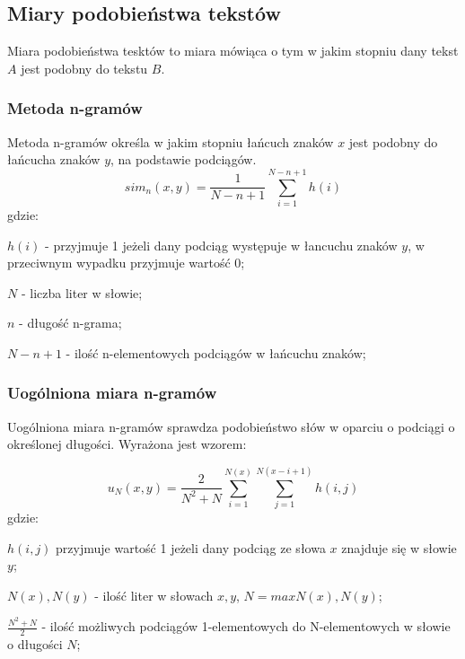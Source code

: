 \documentclass{classrep}
\begin{document}
\subsection{Miary podobieństwa tekstów}
Miara podobieństwa tesktów to miara mówiąca o tym w jakim stopniu dany tekst $A$ jest podobny do tekstu $B$.

\subsubsection{Metoda n-gramów} \label{n_gram}
Metoda n-gramów określa w jakim stopniu łańcuch znaków $x$ jest podobny do łańcucha znaków $y$, na podstawie podciągów.
\begin{equation}
    sim_{n}(x,y)=\frac{1}{N-n+1}\sum_{i=1}^{N-n+1}h(i)
\end{equation}
gdzie:\\
\begin{description}
    \item $h(i)$ - przyjmuje 1 jeżeli dany podciąg występuje w łancuchu znaków $y$, w przeciwnym wypadku przyjmuje wartość 0;
    \item $N$ - liczba liter w słowie;
    \item $n$ - długość n-grama;
    \item $N-n+1$ - ilość n-elementowych podciągów w łańcuchu znaków;
\end{description}

\subsubsection{Uogólniona miara n-gramów}
Uogólniona miara n-gramów sprawdza podobieństwo słów w oparciu o podciągi o określonej długości. Wyrażona jest wzorem:

\begin{equation}
    u_{N}(x, y)=\frac{2}{N^{2}+N}\sum_{i=1}^{N(x)}\sum_{j=1}^{N(x-i+1)}h(i,j)
\end{equation}
gdzie:\\
\begin{description}
    \item $h(i,j)$ przyjmuje wartość 1 jeżeli dany podciąg ze słowa $x$ znajduje się w słowie $y$;
    \item $N(x),N(y)$ - ilość liter w słowach $x, y$, $N=max{N(x),N(y)}$;
    \item $\frac{N^{2}+N}{2}$ - ilość możliwych podciągów 1-elementowych do N-elementowych w słowie o długości $N$;
\end{description}
\end{document}
